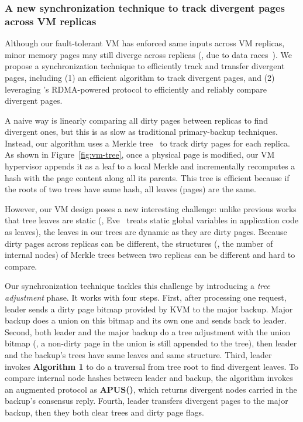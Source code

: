 \vspace{-.15in}\subsubsection{A new synchronization technique to 
track divergent pages across VM replicas}
\label{sec:tracking}\vspace{-.075in}



Although our fault-tolerant VM has enforced same inputs across VM replicas, 
minor memory pages may still diverge across replicas (\eg, due to 
data races~\cite{lu:concurrency-bugs}). We propose a synchronization 
technique to efficiently track and transfer divergent pages, including (1) 
an efficient  algorithm to track divergent pages, and (2) 
leveraging \falcon's RDMA-powered protocol to efficiently and reliably compare 
divergent pages.

A naive way is linearly comparing all  dirty pages between replicas to 
find divergent ones, but this is as slow as traditional primary-backup 
techniques. Instead, our algorithm uses a Merkle tree~\cite{eve:osdi12} to track 
dirty pages for each replica. As shown in Figure~\ref{fig:vm-tree}, once a 
physical page is modified, our VM hypervisor appends it as a leaf to a local 
Merkle and incrementally recomputes a hash with the page content along all its 
parents. This tree is efficient because if the roots of two trees 
have same hash, all leaves (pages) are the same.

However, our VM design poses a new interesting challenge: unlike previous works 
that tree leaves are static (\eg, Eve~\cite{eve:osdi12} treats static global 
variables in application code as leaves), the leaves in our trees are dynamic 
as they are dirty pages. Because dirty pages across replicas can be 
different, the structures (\ie, the number of internal nodes) of Merkle trees 
between two replicas can be different and hard to compare.

Our synchronization technique tackles this challenge by introducing a 
\emph{tree adjustment} phase. It works with four steps. First, after 
processing one request, leader sends a dirty page bitmap provided by KVM to 
the major backup. Major backup does a union on this bitmap and its own one 
and sends back to leader. Second, both leader and the major backup do 
a tree adjustment with the union bitmap (\eg, a non-dirty page in the union is 
still appended to the tree), then leader and the backup's trees have same leaves 
and same structure. Third, leader invokes \textbf{Algorithm 1} to do a 
 traversal from tree root to find divergent leaves. To compare 
internal node hashes between leader and backup, the algorithm invokes an 
augmented \falcon protocol as \textbf{APUS()}, which returns divergent nodes 
carried in the backup's consensus reply. Fourth, leader transfers divergent 
pages to the major backup, then they both clear trees and dirty page flags.

